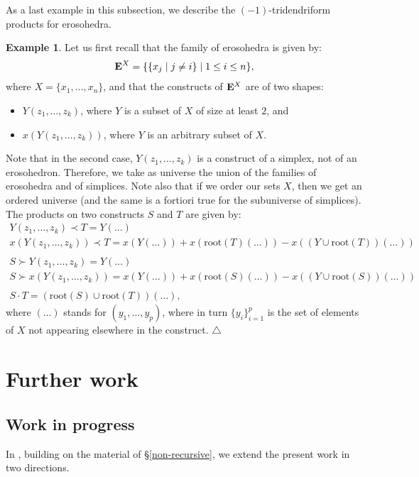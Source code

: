 \documentclass[11pt]{article}
\theoremstyle{definition}
\newtheorem{example}[theo]{Example}
\numberwithin{equation}{section}
\numberwithin{equation}{section}
\newcommand\xqed[1]{%
  \leavevmode\unskip\penalty9999 \hbox{}\nobreak\hfill
  \quad\hbox{#1}}
\newcommand\demo{\xqed{$\triangle$}}
\newcommand{\set}[1]{\{#1\}}
\newcommand{\setc}[2]{\set{#1 \mid #2}}
\newcommand{\hyper}[1]{{\bf #1}}
\newcommand{\bcdot}{\,{\bm \cdot}\,}
\begin{document}
As a last example in this subsection, we describe the $(-1)$-tridendriform products for erosohedra.
\begin{example} \label{eroso2}
Let us first recall that the family of erosohedra is given by:
\begin{align*}
 \hyper{E}^X=\setc{\setc{x_j}{j \neq i}}{1\leq i\leq n},
\end{align*} 
where $X=\{x_1, \ldots, x_n\}$,
and that the constructs of $\hyper{E}^X$ are of two shapes:
\begin{itemize}
\item $Y(z_1, \ldots, z_k)$, where $Y$ is a subset of $X$ of size at least $2$, and 
\item $x(Y(z_1, \ldots, z_k))$, where   $Y$ is an arbitrary subset of $X$. 
\end{itemize}
 Note that in the second case, $Y(z_1, \ldots, z_k)$ is a construct of a simplex, not of an erosohedron.  Therefore, we take as universe the union of the families of erosohedra and of simplices. Note also that if we order our sets $X$, then we get an ordered universe (and the same is a fortiori true for the subuniverse of simplices).
The products on two constructs $S$ and $T$ are given by:
$$\begin{array}{llllll}
Y(z_1, \ldots, z_k) \prec T = Y(\ldots) \\
x(Y(z_1, \ldots, z_k)) \prec T = x(Y(\ldots)) + x(\mbox{root}(T)(\ldots)) - x((Y \cup \mbox{root}(T))(\ldots))\\\\
S \succ Y(z_1, \ldots, z_k) = Y(\ldots) \\
S \succ x(Y(z_1, \ldots, z_k)) = x(Y(\ldots)) + x(\mbox{root}(S)(\ldots)) - x((Y \cup \mbox{root}(S))(\ldots))\\\\
S \bcdot T = (\mbox{root}(S) \cup \mbox{root}(T))(\ldots),
\end{array}$$
where $(\ldots)$ stands for $(y_1, \ldots, y_p)$, where in turn $\{y_i\}_{i=1}^p$ is the set of elements of $X$ not appearing elsewhere in the construct.\demo
\end{example}

\section{Further work}

\subsection*{Work in progress} \label{work-in-progress}
In \cite{RSON}, building on the material of \S\ref{non-recursive}, we extend the present work in two directions.
\end{document}
